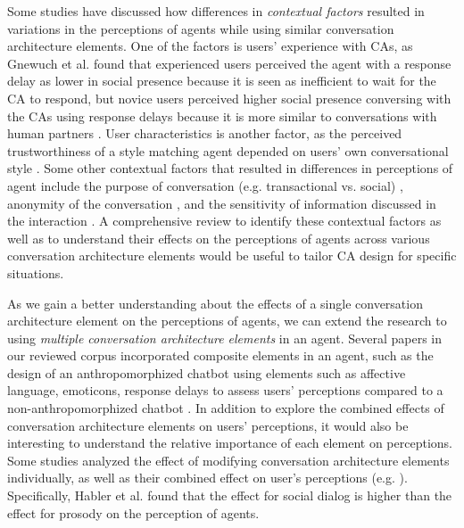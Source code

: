Some studies have discussed how differences in \textit{contextual factors} resulted in variations in the perceptions of agents while using similar conversation architecture elements. One of the factors is users' experience with CAs, as Gnewuch et al. \cite{gnewuch2018faster}\cmt{[19]} found that experienced users perceived the agent with a response delay as lower in social presence because it is seen as inefficient to wait for the CA to respond, but novice users perceived higher social presence conversing with the CAs using response delays because it is more similar to conversations with human partners \cite{gnewuch2018faster}\cmt{[19]}. User characteristics is another factor, as the perceived trustworthiness of a style matching agent depended on users' own conversational style \cite{hoegen2019end}\cmt{[31]}. Some other contextual factors that resulted in differences in perceptions of agent include the purpose of conversation (e.g. transactional vs. social) \cite{jeong2019exploring}\cmt{[10]}, anonymity of the conversation \cite{lee2020hear}\cmt{[23]}, and the sensitivity of information discussed in the interaction \cite{cox2022does}\cmt{[27]}. A comprehensive review to identify these contextual factors as well as to understand their effects on the perceptions of agents across various conversation architecture elements would be useful to tailor CA design for specific situations. 

As we gain a better understanding about the effects of a single conversation architecture element on the perceptions of agents, we can extend the research to using \textit{multiple conversation architecture elements} in an agent. Several papers in our reviewed corpus incorporated composite elements in an agent, such as the design of an anthropomorphized chatbot using elements such as affective language, emoticons, response delays to assess users' perceptions compared to a non-anthropomorphized chatbot \cite{seeger2021chatbots}\cmt{[35]}. In addition to explore the combined effects of conversation architecture elements on users' perceptions, it would also be interesting to understand the relative importance of each element on perceptions. Some studies analyzed the effect of modifying conversation architecture elements individually, as well as their combined effect on user's perceptions (e.g. \cite{habler2019effects, lubold2016effects, zhu2022effects}\cmt{[63][86][26]}). Specifically, Habler et al. \cite{habler2019effects}\cmt{[63]} found that the effect for social dialog is higher than the effect for prosody on the perception of agents. 


